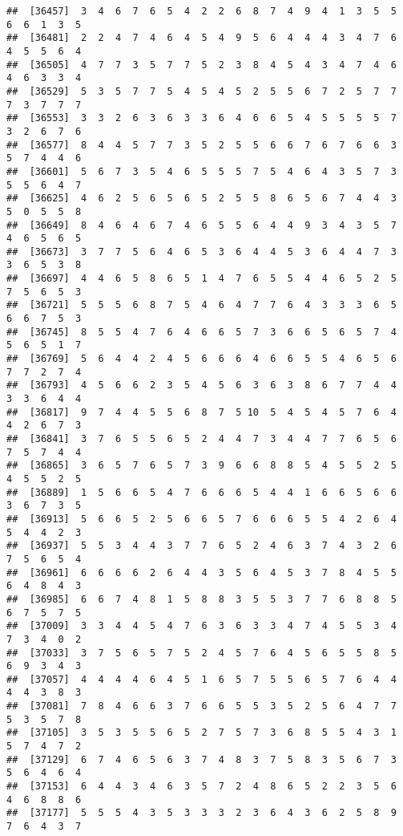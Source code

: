 \documentclass[
]{book}
\begin{document}
\begin{verbatim}
##  [36457]  3  4  6  7  6  5  4  2  2  6  8  7  4  9  4  1  3  5  5  6  6  1  3  5
##  [36481]  2  2  4  7  4  6  4  5  4  9  5  6  4  4  4  3  4  7  6  4  5  5  6  4
##  [36505]  4  7  7  3  5  7  7  5  2  3  8  4  5  4  3  4  7  4  6  4  6  3  3  4
##  [36529]  5  3  5  7  7  5  4  5  4  5  2  5  5  6  7  2  5  7  7  7  3  7  7  7
##  [36553]  3  3  2  6  3  6  3  3  6  4  6  6  5  4  5  5  5  5  7  3  2  6  7  6
##  [36577]  8  4  4  5  7  7  3  5  2  5  5  6  6  7  6  7  6  6  3  5  7  4  4  6
##  [36601]  5  6  7  3  5  4  6  5  5  5  7  5  4  6  4  3  5  7  3  5  5  6  4  7
##  [36625]  4  6  2  5  6  5  6  5  2  5  5  8  6  5  6  7  4  4  3  5  0  5  5  8
##  [36649]  8  4  6  4  6  7  4  6  5  5  6  4  4  9  3  4  3  5  7  4  6  5  6  5
##  [36673]  3  7  7  5  6  4  6  5  3  6  4  4  5  3  6  4  4  7  3  3  6  5  3  8
##  [36697]  4  4  6  5  8  6  5  1  4  7  6  5  5  4  4  6  5  2  5  7  5  6  5  3
##  [36721]  5  5  5  6  8  7  5  4  6  4  7  7  6  4  3  3  3  6  5  6  6  7  5  3
##  [36745]  8  5  5  4  7  6  4  6  6  5  7  3  6  6  5  6  5  7  4  5  6  5  1  7
##  [36769]  5  6  4  4  2  4  5  6  6  6  4  6  6  5  5  4  6  5  6  7  7  2  7  4
##  [36793]  4  5  6  6  2  3  5  4  5  6  3  6  3  8  6  7  7  4  4  3  3  6  4  4
##  [36817]  9  7  4  4  5  5  6  8  7  5 10  5  4  5  4  5  7  6  4  4  2  6  7  3
##  [36841]  3  7  6  5  5  6  5  2  4  4  7  3  4  4  7  7  6  5  6  7  5  7  4  4
##  [36865]  3  6  5  7  6  5  7  3  9  6  6  8  8  5  4  5  5  2  5  4  5  5  2  5
##  [36889]  1  5  6  6  5  4  7  6  6  6  5  4  4  1  6  6  5  6  6  3  6  7  3  5
##  [36913]  5  6  6  5  2  5  6  6  5  7  6  6  6  5  5  4  2  6  4  5  4  4  2  3
##  [36937]  5  5  3  4  4  3  7  7  6  5  2  4  6  3  7  4  3  2  6  7  5  6  5  4
##  [36961]  6  6  6  6  2  6  4  4  3  5  6  4  5  3  7  8  4  5  5  6  4  8  4  3
##  [36985]  6  6  7  4  8  1  5  8  8  3  5  5  3  7  7  6  8  8  5  6  7  5  7  5
##  [37009]  3  3  4  4  5  4  7  6  3  6  3  3  4  7  4  5  5  3  4  7  3  4  0  2
##  [37033]  3  7  5  6  5  7  5  2  4  5  7  6  4  5  6  5  5  8  5  6  9  3  4  3
##  [37057]  4  4  4  4  6  4  5  1  6  5  7  5  5  6  5  7  6  4  4  4  4  3  8  3
##  [37081]  7  8  4  6  6  3  7  6  6  5  5  3  5  2  5  6  4  7  7  5  3  5  7  8
##  [37105]  3  5  3  5  5  6  5  2  7  5  7  3  6  8  5  5  4  3  1  5  7  4  7  2
##  [37129]  6  7  4  6  5  6  3  7  4  8  3  7  5  8  3  5  6  7  3  5  6  4  6  4
##  [37153]  6  4  4  3  4  6  3  5  7  2  4  8  6  5  2  2  3  5  6  4  6  8  8  6
##  [37177]  5  5  5  4  3  5  3  3  3  2  3  6  4  3  6  2  5  8  9  7  6  4  3  7

\end{verbatim}
\end{document}
